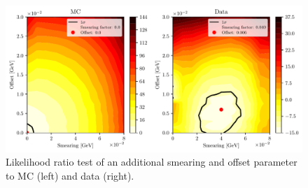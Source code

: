 \begin{figure}[!htbp]
	\centering
	\captionsetup{width=0.8\linewidth}
	\includegraphics[width=\linewidth]{fig/smearing_offset}
	\caption{Likelihood ratio test of an additional smearing and offset parameter to MC (left) and data (right).}
	\label{fig:smearing_offset}
\end{figure}

